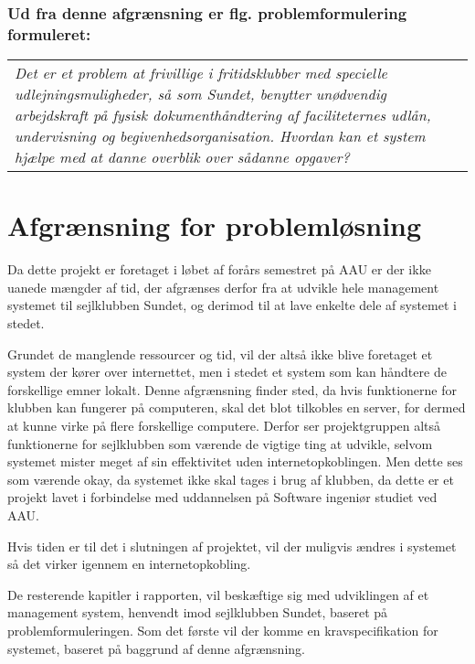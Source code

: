 \subsubsection*{Ud fra denne afgrænsning er flg. problemformulering formuleret:}
\begin{center}
\begin{tabular}{|p{14cm}|}
\textit{Det er et problem at frivillige i fritidsklubber med specielle udlejningsmuligheder, så som Sundet, benytter unødvendig arbejdskraft på fysisk dokumenthåndtering af faciliteternes udlån, undervisning og begivenhedsorganisation. Hvordan kan et system hjælpe med at danne overblik over sådanne opgaver? }
\end{tabular}
\end{center}


\section{Afgrænsning for problemløsning}

Da dette projekt er foretaget i løbet af forårs semestret på AAU er der ikke uanede mængder af tid, der afgrænses derfor fra at udvikle hele management systemet til sejlklubben Sundet, og derimod til at lave enkelte dele af systemet i stedet. 

Grundet de manglende ressourcer og tid, vil der altså ikke blive foretaget et system der kører over internettet, men i stedet et system som kan håndtere de forskellige emner lokalt. Denne afgrænsning finder sted, da hvis funktionerne for klubben kan fungerer på computeren, skal det blot tilkobles en server, for dermed at kunne virke på flere forskellige computere. Derfor ser projektgruppen altså funktionerne for sejlklubben som værende de vigtige ting at udvikle, selvom systemet mister meget af sin effektivitet uden internetopkoblingen. Men dette ses som værende okay, da systemet ikke skal tages i brug af klubben, da dette er et projekt lavet i forbindelse med uddannelsen på Software ingeniør studiet ved AAU.

Hvis tiden er til det i slutningen af projektet, vil der muligvis ændres i systemet så det virker igennem en internetopkobling.

De resterende kapitler i rapporten, vil beskæftige sig med udviklingen af et management system, henvendt imod sejlklubben Sundet, baseret på problemformuleringen. Som det første vil der komme en kravspecifikation for systemet, baseret på baggrund af denne afgrænsning.


